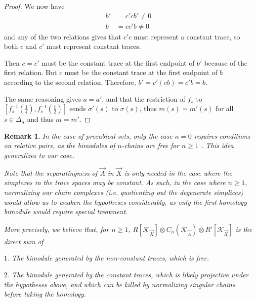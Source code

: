 \documentclass[a4paper,fleqn]{cas-sc}
\newtheorem{rem}{Remark}%
\newcommand{\K}{\mathcal{K}}
\begin{document}
\begin{proof}
We now have 
\begin{align*}
    b' &= c' c b' \neq 0\\
    b &= c c' b \neq 0
\end{align*}
\noindent and any of the two relations gives that $c'c$ must represent a constant trace, so both $c$ and $c'$ must represent constant traces. 

Then $c = c'$ must be the constant trace at the first endpoint of $b'$ because of the first relation. 
But $c$ must be the constant trace at the first endpoint of $b$ according to the second relation. 
Therefore, $b' = c'(c b) = c'b = b$.\\
\fi

The same reasoning gives $a = a'$, and that the restriction of $f_s$ to $[f_s^{-1} (\frac{1}{4}), f_s^{-1} (\frac{1}{2})]$ sends $\sigma'(s)$ to $\sigma(s)$, thus $m(s) = m'(s)$ for all $s \in \Delta_n$ and thus $m = m'$.
\end{proof}

\begin{rem}
In the case of precubical sets, only the case $n=0$ requires conditions on relative pairs, as the bimodules of $n$-chains are free for $n \geq 1$ \cite{eric}. This idea generalizes to our case.

Note that the separatingness of $\Vec{A}$ in $\Vec{X}$ is only needed in the case where the simplexes in the trace spaces may be constant. As such, in the case where $n \geq 1$,  normalizing our chain complexes (i.e. quotienting out the degenerate simplices)  would allow us to weaken the hypotheses considerably, as only the first homology bimodule would require special treatment. 

More precisely, we believe that, for $n \geq 1$, $R[\K_{\Vec{X}}] \otimes C_n(\K_{\Vec{A}}) \otimes R'[\K_{\Vec{X}}]$ is the direct sum of 

$1.$ The bimodule generated by the non-constant traces, which is free.

$2.$ The bimodule generated by the constant traces, which is likely projective under the hypotheses above, and which can be killed by normalizing singular chains before taking the homology.
\end{rem}
\end{document}
